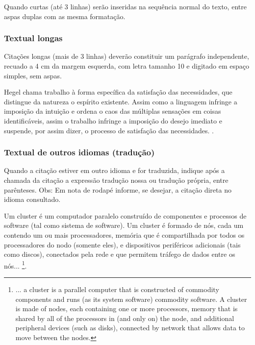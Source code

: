 Quando curtas (até 3 linhas) serão inseridas na sequência normal do texto, entre aspas duplas com as mesma formatação.

\estrutura\subsubsection{\esp Textual longas}\instrucao

Citações longas (mais de 3 linhas) deverão constituir um parágrafo independente, recuado a 4 cm da margem esquerda, 
com letra tamanho 10 e digitado em espaço simples, sem aspas.
\begin{citacaodireta}
Hegel chama trabalho à forma específica da satisfação das necessidades, que
distingue da natureza o espírito existente. Assim como a linguagem infringe
a imposição da intuição e ordena o caos das múltiplas sensações em coisas
identificáveis, assim o trabalho infringe a imposição do \hspace{0.1cm}desejo \hspace{0.1cm}imediato \hspace{0.1cm}e
suspende, por assim dizer, o processo de satisfação das necessidades.
\cite[25]{habermas1997}.
\end{citacaodireta}


\instrucao

\estrutura\subsubsection{\esp Textual de outros idiomas (tradução)}\instrucao

Quando a citação estiver em outro idioma e for traduzida, indique após a chamada da citação a expressão tradução nossa ou tradução própria, entre parênteses. Obs: Em nota de rodapé informe, se desejar, a citação direta no idioma consultado.

\begin{citacaodireta} 
Um cluster é um computador paralelo construído de componentes e processos de software (tal como sistema de software). 
Um cluster é formado de nós, cada um contendo um ou mais processadores, memória que é compartilhada por todos os processadores do nodo 
(somente eles), e dispositivos periféricos adicionais (tais como discos), conectados pela rede e que permitem tráfego de dados entre os nós...
\cite[p. 10, tradução nossa]{groupp2003}\footnote {... a cluster is a parallel computer that is constructed of commodity  components and runs 
(as its system software) commodity software. A cluster is made of nodes, each 
containing one or more processors, memory that is  shared 
by all of the processors in (and only on) the node, and additional peripheral devices (such as disks), connected by network that allows data to move between the nodes.}.
\end{citacaodireta}
 
